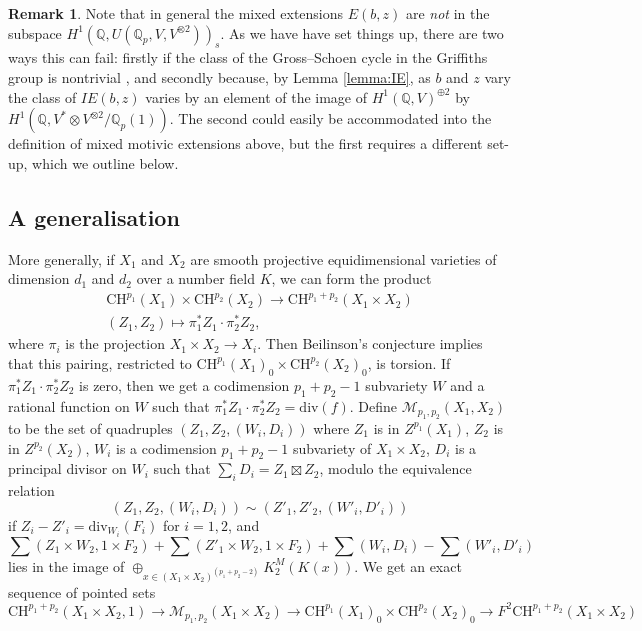 \documentclass[11pt]{amsart}
\def\Q{\mathbb Q}
\newcommand{\divv}{\mathrm{div}}
\theoremstyle{plain}
\theoremstyle{definition}
\newtheorem{remark}{Remark}
\newcommand{\CH}{\mathrm{CH}}
\begin{document}
\begin{remark}
Note that in general the mixed extensions $E(b,z)$ are \textit{not} in the subspace $H^1 (\Q ,U(\Q _p ,V,V^{\otimes 2} ))_s $. As we have have set things up, there are two ways this can fail: firstly if the class of the Gross--Schoen cycle in the Griffiths group is nontrivial \cite{GS}, and secondly because, by Lemma \ref{lemma:IE}, as $b$ and $z$ vary the class of $IE(b,z)$ varies by an element of the image of $H^1 (\Q ,V)^{\oplus 2}$ by $H^1 (\Q ,V^* \otimes V^{\otimes 2}/\Q _p (1))$. The second could easily be accommodated into the definition of mixed motivic extensions above, but the first requires a different set-up, which we outline below.
\end{remark}

\subsection{A generalisation}
More generally, if $X_1 $ and $X_2$ are smooth projective equidimensional varieties of dimension $d_1 $ and $d_2 $ over a number field $K$, we can form the product
\begin{align*}
\CH ^{p_1 }(X_1 )\times \CH ^{p_2}(X_2 )\to \CH ^{p_1 +p_2 }(X_1 \times X_2 ) \\
(Z_1 ,Z_2 )\mapsto \pi _1 ^* Z_1 \cdot \pi _2 ^* Z_2 ,
\end{align*}
where $\pi _i$ is the projection $X_1 \times X_2 \to X_i $. Then Beilinson's conjecture implies that this pairing, restricted to $\CH ^{p_1 }(X_1 )_0 \times \CH ^{p_2 }(X_2 )_0 $, is torsion. If $\pi _1 ^* Z_1 \cdot \pi _2 ^* Z_2 $ is zero, then we get a codimension $p_1 +p_2 -1 $ subvariety $W$ and a rational function on $W$ such that $\pi _1 ^* Z_1 \cdot \pi _2 ^* Z_2 =\divv (f)$. Define $\mathcal{M}_{p_1 ,p_2 }(X_1 ,X_2 )$ to be the set of quadruples $(Z_1 ,Z_2 ,(W_i ,D_i ))$ where $Z_1 $ is in $Z^{p_1 }(X_1 )$, $Z_2 $ is in $Z^{p_2 }(X_2 )$, $W_i$ is a codimension $p_1 +p_2 -1$ subvariety of $X_1 \times X_2 $, $D_i$ is a principal divisor on $W_i $ such that $\sum _i D_i =Z_1 \boxtimes Z_2 $, modulo the equivalence relation
\[
(Z_1 ,Z_2 ,(W_i ,D_i ))\sim (Z' _1 ,Z' _2 ,(W' _i ,D' _i ))
\]
if $Z_i -Z'_i =\divv _{W_i }(F_i )$ for $i=1,2$, and 
\[
\sum (Z_1 \times W_2 ,1\times F_2 )+\sum (Z'_1 \times W_2 ,1 \times F_2  )+\sum (W_i ,D_i )-\sum (W'_i ,D'_i )
\] 
lies in the image of $\oplus _{x\in (X_1 \times X_2 )^{(p_1 +p_2 -2)}}K^M _2 (K(x))$.
We get an exact sequence of pointed sets
\[
\CH ^{p_1 +p_2 }(X_1 \times X_2 ,1)\to \mathcal{M}_{p_1 ,p_2 }(X_1 \times X_2 )\to \CH ^{p_1 }(X_1 )_0 \times \CH ^{p_2 }(X_2 )_0 \to F^2 \CH ^{p_1 +p_2 }(X_1 \times X_2 )
\]
\end{document}
